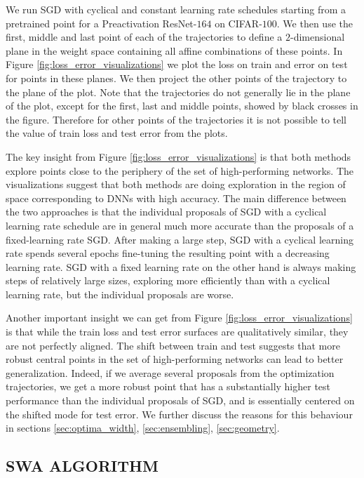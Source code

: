 \documentclass[letterpaper]{article}
\begin{document}
We run SGD with cyclical and constant learning rate schedules starting
from a pretrained point for a Preactivation ResNet-$164$ on CIFAR-$100$. 
We then use the first, middle and last point of each of the trajectories to define
a $2$-dimensional plane in the weight space containing all affine combinations
of these points. 
In Figure \ref{fig:loss_error_visualizations}
we plot the loss on train and error on test for points in these planes.
We then project the other points of the trajectory to the plane of the plot.
Note that the trajectories do not generally lie in the plane of the plot,
except for the first, last and middle points, showed by black crosses in the
figure. Therefore for other points of the trajectories it is not possible to tell the
value of train loss and test error from the plots.

The key insight from Figure \ref{fig:loss_error_visualizations} is that both
methods explore points close to the periphery of the set of high-performing
networks.
The visualizations suggest that both methods are doing exploration in the
region of space corresponding to DNNs with high accuracy. The main difference
between the two approaches is that the individual proposals of SGD with a 
cyclical learning rate schedule are in general much more accurate than the proposals
of a fixed-learning rate SGD.  After making a large step,
SGD with a cyclical learning rate spends several epochs fine-tuning the 
resulting point with a decreasing learning rate. SGD with a fixed learning rate on the other hand is always
making steps of relatively large sizes, exploring more efficiently than with 
a cyclical learning rate, but the individual proposals are worse.

Another important insight we can get from Figure \ref{fig:loss_error_visualizations}
is that while the train loss and test error surfaces are qualitatively similar,
they are not perfectly aligned. The shift between train and test suggests that
more robust central points in the set of high-performing networks
can lead to better generalization.
Indeed, if we average several proposals from the optimization trajectories, we get
a more robust point that has a substantially higher test performance than the 
individual proposals of SGD, and is essentially centered on the shifted mode for
test error. We further discuss the reasons
for this behaviour in sections \ref{sec:optima_width}, \ref{sec:ensembling},
\ref{sec:geometry}. 

\raggedbottom

\subsection{SWA ALGORITHM}
\label{sec:method}
\end{document}
